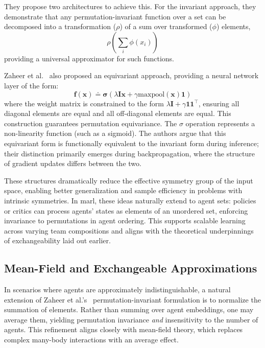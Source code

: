 \documentclass{article}
\begin{document}
They propose two architectures to achieve this.
For the invariant approach, they demonstrate that any 
permutation-invariant function over a set can 
be decomposed into a transformation (\(\rho\)) of a sum over 
transformed (\(\phi\)) elements,
\begin{equation*}
    \rho\left(\sum_i \phi(x_i)\right)
\end{equation*}
providing a universal approximator for such functions. 

Zaheer et al.~\cite{zaheer2017} also proposed an equivariant approach,
providing a neural network layer of the form:
\begin{equation*}
    \mathbf{f}(\mathbf{x}) \doteq \mathbf\sigma (\lambda\mathbf{Ix} 
    + \gamma \text{maxpool}(\mathbf{x})\mathbf{1}) 
\end{equation*}
where the weight matrix is constrained to the form 
\(\lambda\mathbf{I} + \gamma\mathbf{11}^\top\), ensuring all 
diagonal elements are equal and all off-diagonal elements are equal. 
This construction guarantees permutation equivariance.
The \(\sigma\) operation represents a non-linearity function (such as a sigmoid).
The authors argue that this equivariant form is functionally equivalent to the 
invariant form during inference; their distinction primarily emerges during backpropagation, 
where the structure of gradient updates differs between the two.

These structures dramatically reduce the effective symmetry 
group of the input space, enabling better generalization and 
sample efficiency in problems with intrinsic symmetries. 
In \gls{marl}, these ideas naturally extend to agent sets: 
policies or critics can process agents' states as elements 
of an unordered set, enforcing invariance to permutations in agent ordering. 
This supports scalable learning across varying team compositions 
and aligns with the theoretical underpinnings of exchangeability laid out earlier.


\subsection{Mean-Field and Exchangeable Approximations}

In scenarios where agents are approximately indistinguishable, 
a natural extension of Zaheer et al.'s~\cite{zaheer2017} 
permutation-invariant formulation is to normalize the summation of elements. 
Rather than summing over agent embeddings, one may average them,
yielding permutation invariance \emph{and} insensitivity to the number of agents. 
This refinement aligns closely with mean-field theory, which replaces complex 
many-body interactions with an average effect.
\end{document}
